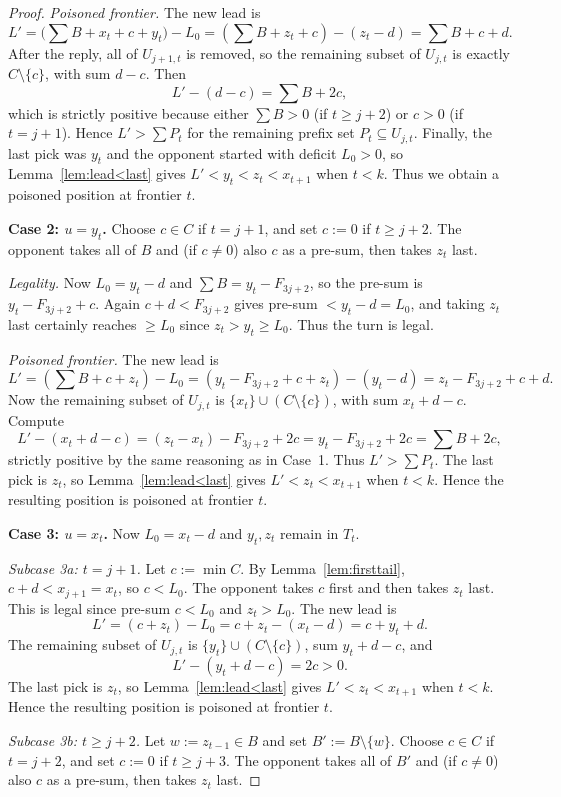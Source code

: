 \documentclass[11pt]{article}
\begin{document}
\begin{proof}
\smallskip\noindent
\emph{Poisoned frontier.}
The new lead is
\[
L'=\bigl(\sum B+x_t+c+y_t\bigr)-L_0=(\sum B+z_t+c)-(z_t-d)=\sum B+c+d.
\]
After the reply, all of $U_{j+1,t}$ is removed, so the remaining subset of $U_{j,t}$ is exactly $C\setminus\{c\}$, with sum $d-c$.
Then
\[
L'-(d-c)=\sum B+2c,
\]
which is strictly positive because either $\sum B>0$ (if $t\ge j+2$) or $c>0$ (if $t=j+1$).
Hence $L'>\sum P_t$ for the remaining prefix set $P_t\subseteq U_{j,t}$.
Finally, the last pick was $y_t$ and the opponent started with deficit $L_0>0$, so Lemma~\ref{lem:lead<last} gives
$L'<y_t<z_t<x_{t+1}$ when $t<k$. Thus we obtain a poisoned position at frontier $t$.

\medskip\noindent
\textbf{Case 2: $u=y_t$.}
Choose $c\in C$ if $t=j+1$, and set $c:=0$ if $t\ge j+2$.
The opponent takes all of $B$ and (if $c\ne 0$) also $c$ as a pre-sum, then takes $z_t$ last.

\smallskip\noindent
\emph{Legality.}
Now $L_0=y_t-d$ and $\sum B=y_t-F_{3j+2}$, so the pre-sum is $y_t-F_{3j+2}+c$.
Again $c+d<F_{3j+2}$ gives pre-sum $<y_t-d=L_0$, and taking $z_t$ last certainly reaches $\ge L_0$ since $z_t>y_t\ge L_0$.
Thus the turn is legal.

\smallskip\noindent
\emph{Poisoned frontier.}
The new lead is
\[
L'=(\sum B+c+z_t)-L_0=(y_t-F_{3j+2}+c+z_t)-(y_t-d)=z_t-F_{3j+2}+c+d.
\]
Now the remaining subset of $U_{j,t}$ is $\{x_t\}\cup(C\setminus\{c\})$, with sum $x_t+d-c$.
Compute
\[
L'-(x_t+d-c)=(z_t-x_t)-F_{3j+2}+2c = y_t-F_{3j+2}+2c=\sum B+2c,
\]
strictly positive by the same reasoning as in Case~1.
Thus $L'>\sum P_t$. The last pick is $z_t$, so Lemma~\ref{lem:lead<last} gives $L'<z_t<x_{t+1}$ when $t<k$.
Hence the resulting position is poisoned at frontier $t$.

\medskip\noindent
\textbf{Case 3: $u=x_t$.}
Now $L_0=x_t-d$ and $y_t,z_t$ remain in $T_t$.

\smallskip\noindent
\emph{Subcase 3a: $t=j+1$.}
Let $c:=\min C$. By Lemma~\ref{lem:firsttail}, $c+d<x_{j+1}=x_t$, so $c<L_0$.
The opponent takes $c$ first and then takes $z_t$ last. This is legal since pre-sum $c<L_0$ and $z_t>L_0$.
The new lead is
\[
L'=(c+z_t)-L_0=c+z_t-(x_t-d)=c+y_t+d.
\]
The remaining subset of $U_{j,t}$ is $\{y_t\}\cup(C\setminus\{c\})$, sum $y_t+d-c$, and
\[
L'-(y_t+d-c)=2c>0.
\]
The last pick is $z_t$, so Lemma~\ref{lem:lead<last} gives $L'<z_t<x_{t+1}$ when $t<k$.
Hence the resulting position is poisoned at frontier $t$.

\smallskip\noindent
\emph{Subcase 3b: $t\ge j+2$.}
Let $w:=z_{t-1}\in B$ and set $B':=B\setminus\{w\}$.
Choose $c\in C$ if $t=j+2$, and set $c:=0$ if $t\ge j+3$.
The opponent takes all of $B'$ and (if $c\ne 0$) also $c$ as a pre-sum, then takes $z_t$ last.


\end{proof}
\end{document}
